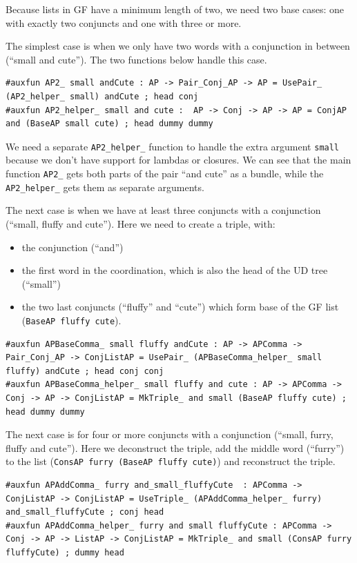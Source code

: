 Because lists in GF have a minimum length of two, we need two base cases: one with exactly two conjuncts and one with three or more.

The simplest case is when we only have two words with a conjunction in between (``small and cute'').
The two functions below handle this case.

\begin{lstlisting}
#auxfun AP2_ small andCute : AP -> Pair_Conj_AP -> AP = UsePair_ (AP2_helper_ small) andCute ; head conj
#auxfun AP2_helper_ small and cute :  AP -> Conj -> AP -> AP = ConjAP and (BaseAP small cute) ; head dummy dummy
\end{lstlisting}
We need a separate \verb|AP2_helper_| function to handle the extra argument \texttt{small} because we don't have support for lambdas or closures. We can see that the main function \verb|AP2_| gets both parts of the pair ``and cute'' as a bundle, while the \verb|AP2_helper_| gets them as separate arguments.

The next case is when we have at least three conjuncts with a conjunction (``small, fluffy and cute''). Here we need to create a triple, with:
\begin{itemize}
    \item the conjunction (``and'')
    \item the first word in the coordination, which is also the head of the UD tree (``small'')
    \item the two last conjuncts (``fluffy'' and ``cute'') which form base of the GF list (\verb|BaseAP fluffy cute|).
\end{itemize}
\begin{lstlisting}
#auxfun APBaseComma_ small fluffy andCute : AP -> APComma -> Pair_Conj_AP -> ConjListAP = UsePair_ (APBaseComma_helper_ small fluffy) andCute ; head conj conj
#auxfun APBaseComma_helper_ small fluffy and cute : AP -> APComma -> Conj -> AP -> ConjListAP = MkTriple_ and small (BaseAP fluffy cute) ; head dummy dummy
\end{lstlisting}

The next case is for four or more conjuncts with a conjunction (``small, furry, fluffy and cute''). Here we deconstruct the triple, add the middle word (``furry'') to the list (\verb|ConsAP furry (BaseAP fluffy cute)|) and reconstruct the triple.
\begin{lstlisting}
#auxfun APAddComma_ furry and_small_fluffyCute  : APComma -> ConjListAP -> ConjListAP = UseTriple_ (APAddComma_helper_ furry) and_small_fluffyCute ; conj head
#auxfun APAddComma_helper_ furry and small fluffyCute : APComma -> Conj -> AP -> ListAP -> ConjListAP = MkTriple_ and small (ConsAP furry fluffyCute) ; dummy head
\end{lstlisting}

